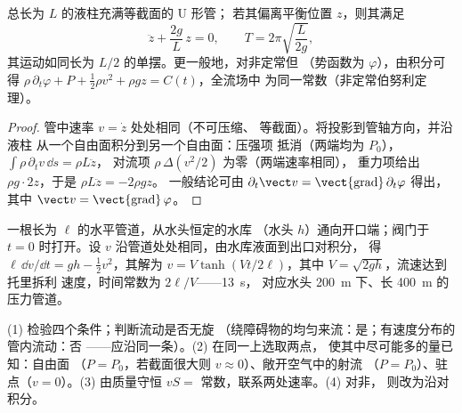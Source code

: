 \begin{proposition}[非定常流动：U 形管]\label{prop:b2:euler-bernoulli:utube}
总长为 $L$ 的液柱充满等截面的 U 形管；
若其偏离平衡位置 $z$，则其满足
\[
\ddot z + \frac{2g}{L}\,z = 0 , \qquad T = 2\pi\sqrt{\frac{L}{2g}} ,
\]
其运动如同长为 $L/2$ 的单摆。更一般地，对非定常但
（势函数为 $\varphi$），由积分可得
$\rho\,\partial_t\varphi + P + \tfrac12\rho v^2 + \rho gz = C(t)$，全流场中
为同一常数（非定常伯努利定理）。
\end{proposition}

\begin{proof}
管中速率 $v = \dot z$ 处处相同（不可压缩、
等截面）。将投影到管轴方向，并沿液柱
从一个自由面积分到另一个自由面：压强项
抵消（两端均为 $P_0$），$\int\rho\,\partial_tv\,\dd s = \rho L\ddot z$，
对流项 $\rho\,\Delta(v^2/2)$ 为零（两端速率相同），
重力项给出 $\rho g\cdot2z$，于是 $\rho L\ddot z = -2\rho gz$。
一般结论可由 $\partial_t\vect v = \operatorname{\vect{grad}}
\partial_t\varphi$ 得出，其中 $\vect v = \operatorname{\vect{grad}}\varphi$。
\end{proof}

\begin{example}[管道启动]\label{ex:b2:euler-bernoulli:start}
一根长为 $\ell$ 的水平管道，从水头恒定的水库
（水头 $h$）通向开口端；阀门于 $t = 0$ 时打开。设 $v$
沿管道处处相同，由水库液面到出口对积分，
得 $\ell\,\dd v/\dd t = gh - \tfrac12v^2$，其解为
$v = V\tanh(Vt/2\ell)$，其中 $V = \sqrt{2gh}$，流速达到托里拆利
速度，时间常数为 $2\ell/V$——\qty{13}{s}，
对应水头 \qty{200}{m} 下、长 \qty{400}{m} 的压力管道。
\end{example}

\begin{method}[使用伯努利定理]\label{met:b2:euler-bernoulli:method}
(1) 检验四个条件；判断流动是否无旋
（绕障碍物的均匀来流：是；有速度分布的管内流动：否
——应沿同一条）。(2) 在同一上选取两点，
使其中尽可能多的量已知：自由面
（$P = P_0$，若截面很大则 $v \approx 0$）、敞开空气中的射流
（$P = P_0$）、驻点（$v = 0$）。(3) 由质量守恒
$vS = $ 常数，联系两处速率。(4) 对非，
则改为沿对积分。
\end{method}

